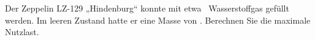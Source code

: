 Der Zeppelin LZ-129 „Hindenburg“ konnte mit etwa \VZO\ Wasserstoffgas gefüllt werden. Im leeren Zustand hatte er eine Masse von \mZO. Berechnen Sie die maximale Nutzlast.
